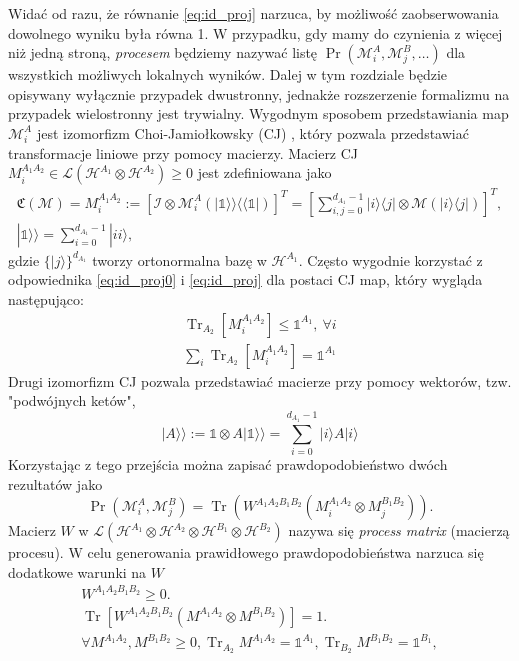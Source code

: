 \documentclass[10pt]{article} %
\DeclareMathOperator{\Trs}{Tr}
\newcommand{\Mats}[1]{\mathcal{L}(#1)}
\newcommand{\Hx}[1]{\mathcal{H}^{#1}}
\newcommand{\HAi}{\Hx{A_1}}
\newcommand{\MXi}[3]{\mathcal{M}^{#1}_{#2}(#3)}
\newcommand{\MXin}[2]{\mathcal{M}^{#1}_{#2}}
\newcommand{\MAin}[0]{\MXin{A}{i}}
\newcommand{\MAi}[1]{\MXi{A}{i}{#1}}
\newcommand{\Tr}[1]{\Trs(#1)}
\newcommand{\Prt}[2]{\Pr(#1, #2)}
\newcommand{\Ket}[1]{|#1\rangle}
\newcommand{\Bra}[1]{\langle#1|}
\newcommand{\BBra}[1]{\langle\langle#1|}
\newcommand{\KKet}[1]{|#1\rangle\rangle}
\newcommand{\WAll}{W^{A_1A_2B_1B_2}}
\newcommand{\MA}{M^{A_1A_2}}
\newcommand{\MB}{M^{B_1B_2}}
\newcommand{\I}{\mathbb{1}}
\newcommand{\MCJ}{\mathfrak{C}}
\begin{document}
Widać od razu, że równanie \eqref{eq:id_proj} narzuca, by możliwość zaobserwowania dowolnego wyniku była równa 1.
W przypadku, gdy mamy do czynienia z więcej niż jedną stroną, \textit{procesem} będziemy nazywać listę $\Pr(\MXin{A}{i}, \MXin{B}{j}, \dots)$ dla wszystkich możliwych lokalnych wyników. Dalej w tym rozdziale będzie opisywany wyłącznie przypadek dwustronny, jednakże rozszerzenie formalizmu na przypadek wielostronny jest trywialny. Wygodnym sposobem przedstawiania map $\MAin$ jest izomorfizm Choi-Jamiołkowsky (CJ) \cite{cj_iso1, cj_iso2}, który pozwala przedstawiać transformacje liniowe przy pomocy macierzy. Macierz CJ $M^{A_1A_2}_i \in \Mats{\Hx{A_1} \otimes \Hx{A_2}} \geq 0$ jest zdefiniowana jako
\begin{gather}
\label{eq:cj_iso}
\MCJ (\mathcal{M}) = M^{A_1A_2}_i := [\mathcal{I} \otimes \MAi{ \KKet{\I} \BBra{\I}}]^T= \left[\sum^{d_{A_1}-1}_{i,j=0} \Ket{i}\Bra{j} \otimes \mathcal{M}(\Ket{i}\Bra{j})\right]^T, \\
\KKet{\I} = \sum^{d_{A_1}-1}_{i=0} \Ket{ii},
\end{gather}
gdzie $\{\Ket{j}\}^{d_{A_1}}$ tworzy ortonormalna bazę w $\HAi$. 
Często wygodnie korzystać z odpowiednika \eqref{eq:id_proj0} i \eqref{eq:id_proj} dla postaci CJ map, który wygląda następująco:
\begin{gather}
\Trs_{A_2} \left[ M^{A_1A_2}_i \right] \leq \I^{A_1},~\forall i\\ 
\sum_i \Trs_{A_2} \left[ M^{A_1A_2}_i \right] = \I^{A_1}
\end{gather}
Drugi izomorfizm CJ pozwala przedstawiać macierze przy pomocy wektorów, tzw. "podwójnych ketów",
\begin{equation}
\KKet{A} := \I \otimes A\KKet{\I} = \sum^{d_{A_1}-1}_{i=0} \Ket{i} A \Ket{i}
\end{equation}
Korzystając z tego przejścia można zapisać prawdopodobieństwo dwóch rezultatów jako 
\begin{equation}
\label{eq:cj_prob}
\Prt{\MAin}{\MXin{B}{j}} = \Tr{\WAll(M^{A_1A_2}_i \otimes M^{B_1B_2}_j)}.
\end{equation}
Macierz $W$ w $\Mats{\Hx{A_1} \otimes \Hx{A_2} \otimes \Hx{B_1} \otimes \Hx{B_2}}$ nazywa się \textit{process matrix} (macierzą procesu).
W celu generowania prawidłowego prawdopodobieństwa narzuca się dodatkowe warunki na $W$
\begin{gather}
\label{eq:non_neg}
\WAll \geq 0. \\
\label{eq:sums_to_id1}
\Trs
\left[
\WAll
\left(
M^{A_1A_2} \otimes M^{B_1B_2}
\right)
\right]=1.\\
\label{eq:sums_to_id2}
\forall M^{A_1A_2}, M^{B_1B_2} \geq 0, \Trs_{A_2} \MA = \mathbb{1}^{A_1}, \Trs_{B_2} \MB = \mathbb{1}^{B_1},
\end{gather}
\end{document}
